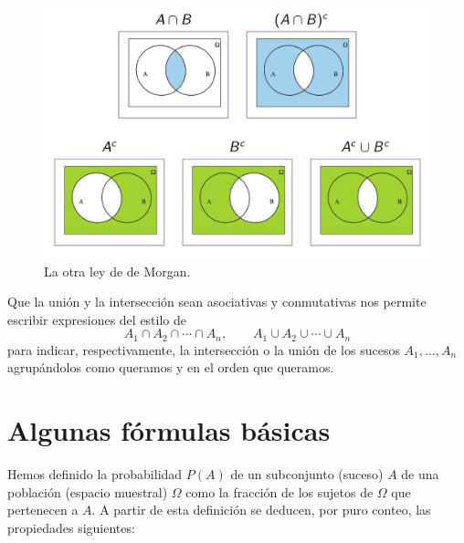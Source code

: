 \documentclass[
]{book}
\theoremstyle{definition}
\theoremstyle{definition}
\theoremstyle{definition}
\theoremstyle{definition}
\theoremstyle{remark}
\begin{document}
\begin{figure}

{\centering \includegraphics[width=0.8\linewidth]{INREMDN_files/figure-html/dM2BD} 

}

\caption{La otra ley de de Morgan.}\label{fig:unnamed-chunk-93}
\end{figure}

Que la unión y la intersección sean asociativas y conmutativas nos permite escribir expresiones del estilo de
\[
A_1\cap A_2\cap \cdots \cap A_n,\qquad A_1\cup A_2\cup \cdots \cup A_n
\]
para indicar, respectivamente, la intersección o la unión de los sucesos \(A_1,\ldots,A_n\) agrupándolos como queramos y en el orden que queramos.

\hypertarget{algunas-fuxf3rmulas-buxe1sicas}{%
\section{Algunas fórmulas básicas}\label{algunas-fuxf3rmulas-buxe1sicas}}

Hemos definido la probabilidad \(P(A)\) de un subconjunto (suceso) \(A\) de una población (espacio muestral) \(\Omega\) como la fracción de los sujetos de \(\Omega\) que pertenecen a \(A\). A partir de esta definición se deducen, por puro conteo, las propiedades siguientes:
\end{document}
